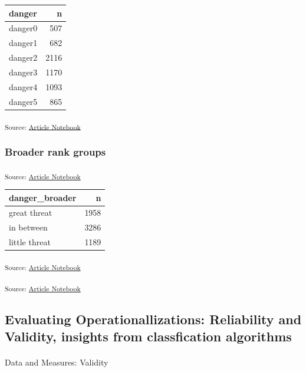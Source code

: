 \documentclass[
  letterpaper,
  DIV=11,
  numbers=noendperiod]{scrartcl}
\makeatletter
\let\oldparagraph\paragraph
\renewcommand{\paragraph}{
    \@ifstar
      \xxxParagraphStar
      \xxxParagraphNoStar
  }
\newcommand{\xxxParagraphStar}[1]{\oldparagraph*{#1}\mbox{}}
\newcommand{\xxxParagraphNoStar}[1]{\oldparagraph{#1}\mbox{}}
\makeatother
\begin{document}
\begin{longtable}[]{@{}lr@{}}
\toprule\noalign{}
danger & n \\
\midrule\noalign{}
\endhead
\bottomrule\noalign{}
\endlastfoot
danger0 & 507 \\
danger1 & 682 \\
danger2 & 2116 \\
danger3 & 1170 \\
danger4 & 1093 \\
danger5 & 865 \\
\end{longtable}

\textsubscript{Source:
\href{https://h-christy.github.io/data-ethics-final/index.qmd.html}{Article
Notebook}}

\subsubsection{Broader rank groups}\label{broader-rank-groups}

\textsubscript{Source:
\href{https://h-christy.github.io/data-ethics-final/index.qmd.html}{Article
Notebook}}

\begin{longtable}[]{@{}lr@{}}
\toprule\noalign{}
danger\_broader & n \\
\midrule\noalign{}
\endhead
\bottomrule\noalign{}
\endlastfoot
great threat & 1958 \\
in between & 3286 \\
little threat & 1189 \\
\end{longtable}

\textsubscript{Source:
\href{https://h-christy.github.io/data-ethics-final/index.qmd.html}{Article
Notebook}}

\textsubscript{Source:
\href{https://h-christy.github.io/data-ethics-final/index.qmd.html}{Article
Notebook}}

\subsection{Evaluating Operationallizations: Reliability and Validity,
insights from classfication
algorithms}\label{evaluating-operationallizations-reliability-and-validity-insights-from-classfication-algorithms}

\paragraph{Data and Measures:
Validity}\label{data-and-measures-validity}
\end{document}
